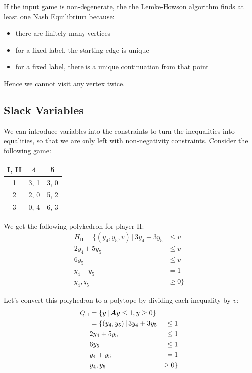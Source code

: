 	If the input game is non-degenerate, the the Lemke-Howson algorithm finds
	at least one Nash Equilibrium because:
	\begin{itemize}
		\item there are finitely many vertices
		\item for a fixed label, the starting edge is unique
		\item for a fixed label, there is a unique continuation from that point
	\end{itemize}

	Hence we cannot visit any vertex twice.

	\subsection{Slack Variables}
		We can introduce variables into the constraints to turn the
		inequalities into equalities, so that we are only left with
		non-negativity constraints. Consider the following game:

		\begin{center}
			\begin{tabular}{|c|c|c|}
				\hline
				\textbf{I}, \textbf{II} & 4 & 5 \\ \hline
				1 & 3, 1 & 3, 0 \\ \hline
				2 & 2, 0 & 5, 2 \\ \hline
				3 & 0, 4 & 6, 3 \\ \hline
			\end{tabular}
		\end{center}

		We get the following polyhedron for player II:
		\begin{equation*}
			\begin{split}
				H_\text{II} = \{ (y_4, y_5, v) \, | \, 3y_4 + 3y_5 & \le v \\
				2y_4 + 5y_5 & \le v \\
				6y_5 & \le v \\
				y_4 + y_5 & = 1 \\
				y_4, y_5 & \ge 0 \}
			\end{split}
		\end{equation*}

		Let's convert this polyhedron to a polytope by dividing each inequality
		by $v$:
		\begin{alignat}{2}
			Q_\text{II} & = \{ y \, | \, \bm{A}y \le 1, y \ge 0 \} \\
			& = \{ (y_4, y_5) \, | \, 3y_4 + 3y_5 & \le 1 \\
			& 2y_4 + 5y_5 & \le 1 \\
			& 6y_5 & \le 1 \\
			& y_4 + y_5 & = 1 \\
			& y_4, y_5 & \ge 0 \}
		\end{alignat}

